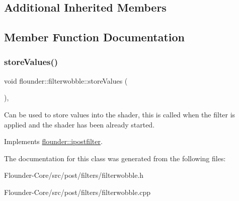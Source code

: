 \subsection*{Additional Inherited Members}


\subsection{Member Function Documentation}
\mbox{\label{classflounder_1_1filterwobble_aa89ed7a9f3ad52790223b558aaff0cc4}} 
\subsubsection{\texorpdfstring{store\+Values()}{storeValues()}}
{\footnotesize\ttfamily void flounder\+::filterwobble\+::store\+Values (\begin{DoxyParamCaption}{ }\end{DoxyParamCaption})\hspace{0.3cm}{\ttfamily [override]}, {\ttfamily [virtual]}}



Can be used to store values into the shader, this is called when the filter is applied and the shader has been already started. 



Implements \hyperlink{classflounder_1_1ipostfilter_a9b658b4672718d5ac36539875bde722e}{flounder\+::ipostfilter}.



The documentation for this class was generated from the following files\+:\begin{DoxyCompactItemize}
\item 
Flounder-\/\+Core/src/post/filters/filterwobble.\+h\item 
Flounder-\/\+Core/src/post/filters/filterwobble.\+cpp\end{DoxyCompactItemize}
